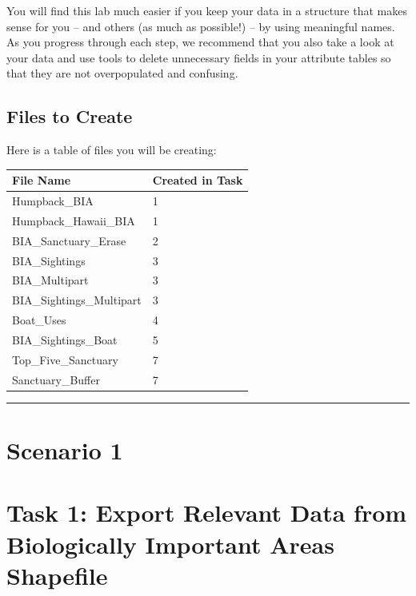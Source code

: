 \documentclass[
]{book}
\begin{document}
You will find this lab much easier if you keep your data in a structure that makes sense for you -- and others (as much as possible!) -- by using meaningful names. As you progress through each step, we recommend that you also take a look at your data and use tools to delete unnecessary fields in your attribute tables so that they are not overpopulated and confusing.

\hypertarget{files-to-create}{%
\subsection*{Files to Create}\label{files-to-create}}

Here is a table of files you will be creating:

\begin{tabular}{ll}
\toprule
File Name & Created in Task\\
\midrule
Humpback\_BIA & 1\\
Humpback\_Hawaii\_BIA & 1\\
BIA\_Sanctuary\_Erase & 2\\
BIA\_Sightings & 3\\
BIA\_Multipart & 3\\
\addlinespace
BIA\_Sightings\_Multipart & 3\\
Boat\_Uses & 4\\
BIA\_Sightings\_Boat & 5\\
Top\_Five\_Sanctuary & 7\\
Sanctuary\_Buffer & 7\\
\bottomrule
\end{tabular}

\begin{center}\rule{0.5\linewidth}{0.5pt}\end{center}

\hypertarget{scenario-1}{%
\section*{Scenario 1}\label{scenario-1}}

\hypertarget{task-1-export-relevant-data-from-biologically-important-areas-shapefile}{%
\section*{Task 1: Export Relevant Data from Biologically Important Areas Shapefile}\label{task-1-export-relevant-data-from-biologically-important-areas-shapefile}}
\end{document}

